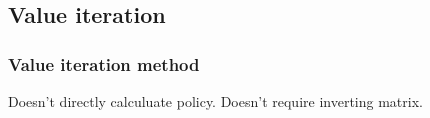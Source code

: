 
\subsection{Value iteration}

\subsubsection{Value iteration method}

Doesn't directly calculuate policy. Doesn't require inverting matrix.

